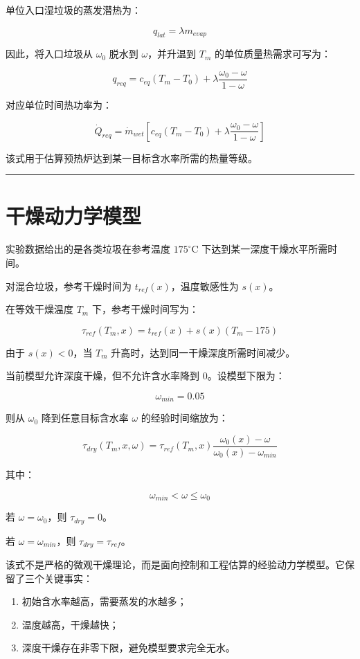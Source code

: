 \documentclass[UTF8,openany,zihao=-4,oneside]{ctexbook}
\providecommand{\tightlist}{\setlength{\itemsep}{0pt}\setlength{\parskip}{0pt}}
\newcommand{\manualdivider}{\par\vspace{0.6em}\noindent\textcolor{FGLine}{\rule{\linewidth}{0.7pt}}\vspace{0.6em}\par}
\begin{document}
单位入口湿垃圾的蒸发潜热为：

\[
q_{lat}=\lambda m_{evap}
\]

因此，将入口垃圾从 \(\omega_0\) 脱水到 \(\omega\)，并升温到 \(T_m\) 的单位质量热需求可写为：

\[
q_{req}=c_{eq}(T_m-T_0)+\lambda\frac{\omega_0-\omega}{1-\omega}
\]

对应单位时间热功率为：

\[
\dot Q_{req}=\dot m_{wet}\left[c_{eq}(T_m-T_0)+\lambda\frac{\omega_0-\omega}{1-\omega}\right]
\]

该式用于估算预热炉达到某一目标含水率所需的热量等级。

\manualdivider

\section{干燥动力学模型}\label{ux5e72ux71e5ux52a8ux529bux5b66ux6a21ux578b}

实验数据给出的是各类垃圾在参考温度 \(175^\circ\mathrm{C}\) 下达到某一深度干燥水平所需时间。

对混合垃圾，参考干燥时间为 \(t_{ref}(x)\)，温度敏感性为 \(s(x)\)。

在等效干燥温度 \(T_m\) 下，参考干燥时间写为：

\[
\tau_{ref}(T_m,x)=t_{ref}(x)+s(x)(T_m-175)
\]

由于 \(s(x)<0\)，当 \(T_m\) 升高时，达到同一干燥深度所需时间减少。

当前模型允许深度干燥，但不允许含水率降到 0。设模型下限为：

\[
\omega_{min}=0.05
\]

则从 \(\omega_0\) 降到任意目标含水率 \(\omega\) 的经验时间缩放为：

\[
\tau_{dry}(T_m,x,\omega)=\tau_{ref}(T_m,x)\frac{\omega_0(x)-\omega}{\omega_0(x)-\omega_{min}}
\]

其中：

\[
\omega_{min}<\omega\le\omega_0
\]

若 \(\omega=\omega_0\)，则 \(\tau_{dry}=0\)。

若 \(\omega=\omega_{min}\)，则 \(\tau_{dry}=\tau_{ref}\)。

该式不是严格的微观干燥理论，而是面向控制和工程估算的经验动力学模型。它保留了三个关键事实：

\begin{enumerate}
\def\labelenumi{\arabic{enumi}.}
\tightlist
\item
  初始含水率越高，需要蒸发的水越多；
\item
  温度越高，干燥越快；
\item
  深度干燥存在非零下限，避免模型要求完全无水。
\end{enumerate}
\end{document}
